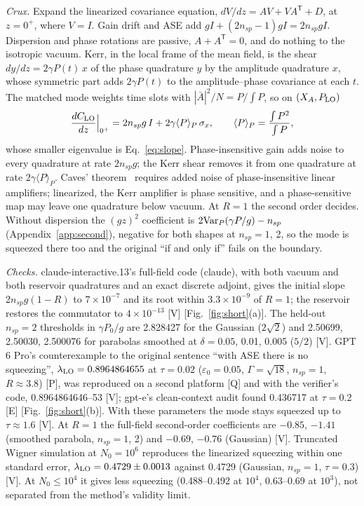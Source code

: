 \documentclass[aps,pra,twocolumn,superscriptaddress,nofootinbib,floatfix]{revtex4-2}
\newcommand{\nsp}{n_{sp}}
\newcommand{\eps}{\varepsilon_0}
\newcommand{\lamLO}{\lambda_{\rm LO}}
\newcommand{\rk}[1]{[\textsf{#1}]}
\begin{document}
\textit{Crux.} Expand the linearized covariance equation, $dV/dz=AV+VA^{\mathsf T}+D$, at $z=0^+$, where $V=I$. Gain drift
and ASE add $gI+(2\nsp-1)gI=2\nsp gI$. Dispersion and phase rotations are passive, $A+A^{\mathsf T}=0$, and do nothing
to the isotropic vacuum. Kerr, in the local frame of the mean field, is the shear $dy/dz=2\gamma P(t)\,x$ of the phase
quadrature $y$ by the amplitude quadrature $x$, whose symmetric part adds $2\gamma P(t)$ to the amplitude--phase covariance
at each $t$. The matched mode weights time slots with $|\bar A|^2/N=P/\!\int P$, so on $(X_A,P_{\rm LO})$
\begin{equation}
\frac{dC_{\rm LO}}{dz}\Big|_{0^+}=2\nsp g\,I+2\gamma\langle P\rangle_P\,\sigma_x,\qquad
\langle P\rangle_P=\frac{\int P^2}{\int P},\label{eq:firstorder}
\end{equation}
whose smaller eigenvalue is Eq.~\eqref{eq:slope}. Phase-insensitive gain adds noise to every quadrature at rate $2\nsp g$;
the Kerr shear removes it from one quadrature at rate $2\gamma\langle P\rangle_P$. Caves' theorem~\cite{caves1982} requires
added noise of phase-insensitive linear amplifiers; linearized, the Kerr amplifier is phase sensitive, and a
phase-sensitive map may leave one quadrature below vacuum. At
$R=1$ the second order decides. Without dispersion the $(gz)^2$ coefficient is $2{\rm Var}_P(\gamma P/g)-\nsp$
(Appendix~\ref{app:second}), negative for both shapes at $\nsp=1$, 2, so the mode is squeezed there too and the
original ``if and only if'' fails on the boundary.

\textit{Checks.} claude-interactive.13's full-field code (claude), with both vacuum and both reservoir quadratures and an
exact discrete adjoint, gives the initial slope $2\nsp g(1-R)$ to $7\times10^{-7}$ and its root within $3.3\times10^{-9}$ of
$R=1$; the reservoir restores the commutator to $4\times10^{-13}$ \rk{V} [Fig.~\ref{fig:short}(a)]. The held-out $\nsp=2$
thresholds in $\gamma P_0/g$ are 2.828427 for the Gaussian ($2\sqrt2$) and 2.50699, 2.50030, 2.500076 for parabolas smoothed
at $\delta=0.05$, 0.01, 0.005 ($5/2$) \rk{V}. GPT 6 Pro's counterexample to the original sentence ``with ASE there is no
squeezing'', $\lamLO=0.8964864655$ at $\tau=0.02$ ($\eps=0.05$, $\Gamma=\sqrt{18}$, $\nsp=1$, $R\approx3.8$) \rk{P}, was
reproduced on a second platform \rk{Q} and with the verifier's code, 0.8964864646--53 \rk{V}; gpt-e's clean-context audit
found 0.436717 at $\tau=0.2$ \rk{E} [Fig.~\ref{fig:short}(b)]. With these parameters the mode stays squeezed up to
$\tau\approx1.6$ \rk{V}. At $R=1$ the full-field second-order coefficients are $-0.85$, $-1.41$ (smoothed parabola, $\nsp=1$, 2) and $-0.69$,
$-0.76$ (Gaussian) \rk{V}. Truncated Wigner simulation at $N_0=10^6$ reproduces the linearized squeezing within one
standard error, $\lamLO=0.4729\pm0.0013$ against 0.4729 (Gaussian, $\nsp=1$, $\tau=0.3$) \rk{V}. At $N_0\le10^4$ it gives
less squeezing (0.488--0.492 at $10^4$, 0.63--0.69 at $10^3$), not separated from the method's validity limit.
\end{document}

